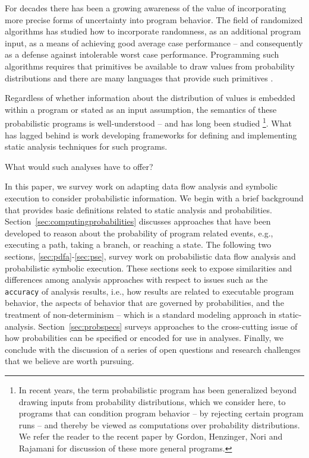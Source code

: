 For decades there has been a growing awareness of the value of 
incorporating more precise forms of uncertainty into program behavior.  
The field of randomized algorithms has studied how to incorporate
randomness, as an additional program input, as a means of achieving
good average case performance -- and consequently as a defense against
intolerable worst case performance.
Programming such algorithms requires that primitives be available
to draw values from probability distributions and there are many
languages that provide such primitives \cite{NetLogo,others}.  

Regardless of whether information about the distribution of
values is embedded within a program or stated as an input assumption,
the semantics of these probabilistic programs is well-understood --
and has long been studied \cite{kozen1981semantics,others}
\footnote{In recent
years, the term probabilistic program has been generalized beyond
drawing inputs from probability distributions, which we
consider here, to programs that can condition program behavior -- by
rejecting certain program runs -- and thereby be viewed as
computations over probability distributions.  We refer the reader to the
recent paper by Gordon, Henzinger, Nori and Rajamani \cite{Gordon2014}
for discussion of these more general programs.}. 
What has lagged behind is work developing frameworks for 
defining and implementing static analysis techniques for such programs.

What would such analyses have to offer?

In this paper, we survey work on adapting data flow analysis 
and symbolic execution to consider probabilistic information.
We begin with a brief background that provides basic definitions
related to static analysis and probabilities.
Section~\ref{sec:computingprobabilities} discusses approaches that
have been developed to reason about the probability of program
related events, e.g., executing a path, taking a branch, or reaching a state.
The following two sections, \ref{sec:pdfa}-\ref{sec:pse}, 
survey work on probabilistic data flow analysis and probabilistic
symbolic execution.  These sections seek to expose similarities
and differences among analysis approaches with respect to issues
such as the \texttt{accuracy} of analysis results, i.e., how results
are related to executable program behavior, 
the aspects of behavior that are governed by probabilities, and
the treatment of non-determinism -- which is a standard modeling
approach in static-analysis.
Section~\ref{sec:probspecs} surveys approaches to the cross-cutting
issue of how probabilities can be specified or encoded for use
in analyses.
Finally, we conclude with the discussion of a series of open questions
and research challenges that we believe are worth pursuing.

